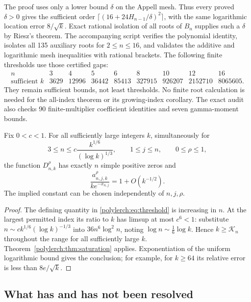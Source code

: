 \begin{remark}
The proof uses only a lower bound $\delta$ on the Appell mesh. Thus every
proved $\delta>0$ gives the sufficient order
$\lceil(16+24H_{n-1}/\delta)^2\rceil$, with the same logarithmic
location error $8/\sqrt k$. Exact rational isolation of all roots of
$B_n$ supplies such a $\delta$ by Riesz's theorem. The accompanying
script verifies the polynomial identity, isolates all 135 auxiliary
roots for $2\le n\le16$, and validates the additive and logarithmic
mesh inequalities with rational brackets. The following finite
thresholds use those certified gaps:
\[
\begin{array}{c|rrrrrrrr}
n&3&4&5&6&8&10&12&16\\\hline
\text{sufficient }k&3629&12996&36442&85413&327915&926207&2152710&8065605.
\end{array}
\]
They remain sufficient bounds, not least thresholds. No finite root
calculation is needed for the all-index theorem or its growing-index
corollary. The exact audit also checks 90 finite-multiplier coefficient
identities and seven gamma-moment bounds.
\end{remark}

\begin{corollary}
\label{polylerch:cor:growing}
Fix $0<c<1$. For all sufficiently large integers $k$, simultaneously for
\[
 3\le n\le c\frac{k^{1/6}}{(\log k)^{1/3}},\qquad
 1\le j\le n,\qquad0\le\rho\le1,
\]
the function $D_{n,k}^{\rho}$ has exactly $n$ simple positive zeros and
\[
 \frac{a_{n,j,k}^{\rho}}{k e^{-x_{n,j}}}=1+O(k^{-1/2}).
\]
The implied constant can be chosen independently of $n,j,\rho$.
\end{corollary}
\begin{proof}
The defining quantity in \eqref{polylerch:eq:threshold} is increasing
in $n$. At the largest permitted index its ratio to $k$ has limsup
at most $c^6<1$: substitute
$n\sim c k^{1/6}(\log k)^{-1/3}$ into
$36n^6\log^2 n$, noting $\log n\sim\tfrac16\log k$.
Hence $k\ge\mathcal K_n$ throughout the range for all sufficiently
large $k$. Theorem~\ref{polylerch:thm:saturation} applies.
Exponentiation of the uniform logarithmic bound gives the conclusion;
for example, for $k\ge64$ its relative error is less than
$8e/\sqrt k$.
\end{proof}

\subsection{What has and has not been resolved}

